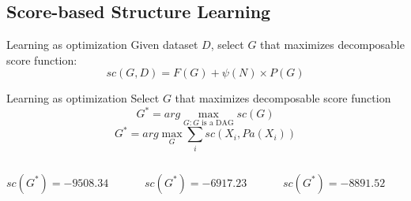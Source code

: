 \subsection{Score-based Structure Learning}
	\begin{frame}
		\begin{block}{Learning as optimization}
			Given dataset $D$, select $G$ that maximizes \alert{decomposable} score function:
				\[ {sc}( G , D ) = F( G ) + \psi( N ) \times P( G ) \]
		\end{block}
	\end{frame}
	\begin{frame}
		\begin{block}{Learning as optimization}
			Select $G$ that maximizes \alert{decomposable score function}
			\[ G^* = arg \max_{G: G \text{ is a DAG}} {sc}( G ) \]
			\[ G^* = arg \max_G \sum_i {sc}( X_i , {Pa}( X_i ) ) \]
		\end{block}
	\end{frame}
	
	\begin{frame}[fragile]
		\begin{columns}
			\begin{column}{.3\textwidth}
				\begin{figure}
					\centering
					
				\end{figure}
				\centering
				${sc}( G^* ) = -9508.34$
			\end{column}
			\begin{column}{.3\textwidth}
				\begin{figure}
					\centering
					
				\end{figure}
				\centering
				${sc}( G^* ) = -6917.23$
			\end{column}
			\begin{column}{.3\textwidth}
				\begin{figure}
					\centering
					
				\end{figure}
				\centering
				${sc}( G^* ) = -8891.52$
			\end{column}
		\end{columns}
	\end{frame}